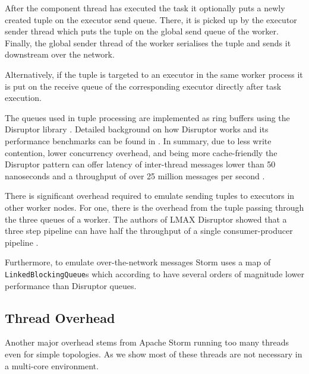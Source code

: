 After the component thread has executed the task it optionally puts a newly created tuple on the executor send queue. There, it is picked up by the executor sender thread which puts the tuple on the global send queue of the worker. Finally, the global sender thread of the worker serialises the tuple and sends it downstream over the network.

Alternatively, if the tuple is targeted to an executor in the same worker process it is put on the receive queue of the corresponding executor directly after task execution.

The queues used in tuple processing are implemented as ring buffers using the Disruptor library \citep{LMAXDisruptor}. Detailed background on how Disruptor works and its performance benchmarks can be found in \citep{Thompson_Farley_Barker_Gee_Stewart_2011}. In summary, due to less write contention, lower concurrency overhead, and being more cache-friendly the Disruptor pattern can offer latency of inter-thread messages lower than 50 nanoseconds and a throughput of over 25 million messages per second \cite{Thompson_Farley_Barker_Gee_Stewart_2011}.

There is significant overhead required to emulate sending tuples to executors in other worker nodes. For one, there is the overhead from the tuple passing through the three queues of a worker. The authors of LMAX Disruptor showed that a three step pipeline can have half the throughput of a single consumer-producer pipeline \citep{DisruptorWiki}.

Furthermore, to emulate over-the-network messages Storm uses a map of \\ \texttt{LinkedBlockingQueue}s which according to \cite{Thompson_Farley_Barker_Gee_Stewart_2011} have several orders of magnitude lower performance than Disruptor queues.

\subsection{Thread Overhead}

Another major overhead stems from Apache Storm running too many threads even for simple topologies. As we show most of these threads are not necessary in a multi-core environment.

